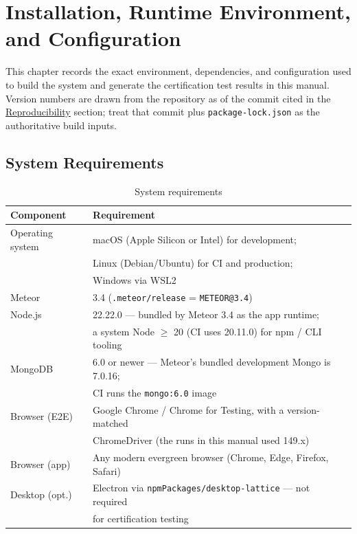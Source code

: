 \setcounter{chapter}{-1}
\chapter{Installation, Runtime Environment, and Configuration}
\label{chap:install}


This chapter records the exact environment, dependencies, and configuration
used to build the system and generate the certification test results in this
manual. Version numbers are drawn from the repository as of the commit cited in
the \hyperref[sec:reproducibility]{Reproducibility} section; treat that commit
plus \texttt{package-lock.json} as the authoritative build inputs.

\section{System Requirements}

\begin{table}[h]
\centering
\begin{tabular}{ll}
\toprule
\textbf{Component} & \textbf{Requirement} \\
\midrule
Operating system & macOS (Apple Silicon or Intel) for development; \\
                 & Linux (Debian/Ubuntu) for CI and production; \\
                 & Windows via WSL2 \\
Meteor           & 3.4 (\texttt{.meteor/release} = \texttt{METEOR@3.4}) \\
Node.js          & 22.22.0 --- bundled by Meteor 3.4 as the app runtime; \\
                 & a system Node $\geq$ 20 (CI uses 20.11.0) for npm / CLI tooling \\
MongoDB          & 6.0 or newer --- Meteor's bundled development Mongo is 7.0.16; \\
                 & CI runs the \texttt{mongo:6.0} image \\
Browser (E2E)    & Google Chrome / Chrome for Testing, with a version-matched \\
                 & ChromeDriver (the runs in this manual used 149.x) \\
Browser (app)    & Any modern evergreen browser (Chrome, Edge, Firefox, Safari) \\
Desktop (opt.)   & Electron via \texttt{npmPackages/desktop-lattice} --- not required \\
                 & for certification testing \\
\bottomrule
\end{tabular}
\caption{System requirements}
\end{table}

